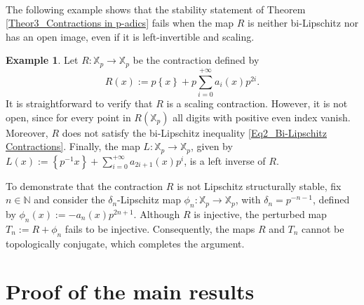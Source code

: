 \documentclass[a4paper, 12pt]{article}
\theoremstyle{definition}
\newtheorem{example}[theorem]{Example}
\begin{document}
	
	
	\paragraph{}
	
	The following example shows that the stability statement of Theorem \ref{Theor3_Contractions in p-adics} fails when the map $R$ is neither bi-Lipschitz nor has an open image, even if it is left-invertible and scaling. 
	
	
	\begin{example} 
		Let $R: \mathbb{X}_{p} \to \mathbb{X}_{p}$ be the contraction defined by  
		$$ R \left(  x  \right)  :=   p  \left\{  x  \right\}  + p \sum_{i=0}^{+ \infty }  a_{i} \left(  x  \right)  p^{2i}.  $$ 
		It is straightforward to verify that $R$ is a scaling contraction. 
		However, it is not open, since for every point in $R \left(  \mathbb{X}_{p}  \right) $ all digits with positive even index vanish. Moreover, $R$ does not satisfy the bi-Lipschitz inequality \eqref{Eq2_Bi-Lipschitz Contractions}. 
		Finally, the map $L : \mathbb{X}_{p} \to \mathbb{X}_{p}$, given by $L \left(  x  \right)  :=  \left\{  p^{-1} x  \right\}  + \sum_{i=0}^{+ \infty } a_{2i+1} \left(  x  \right)  p^{i}$, is a left inverse of $R$. 
		
		To demonstrate that the contraction $R$ is not Lipschitz structurally stable, fix $n \in \mathbb{N} $ and consider the $\delta_{n}$-Lipschitz map $\phi_{n}: \mathbb{X}_{p} \to \mathbb{X}_{p}$, with $\delta_{n} = p^{-n-1}$, defined by $\phi_{n} \left(  x  \right)  := - a_{n} \left(  x  \right)  p^{2n+1}$. 
		Although $R$ is injective, the perturbed map $T_{n}:= R + \phi_{n}$ fails to be injective. Consequently, the maps $R$ and $T_{n}$ cannot be topologically conjugate, which completes the argument.  
		
	\end{example}
	
	
	
	
	
	
	
	
	
	
	
	
	
	
	
	
	
	
	
	\section{Proof of the main results}\label{Sec_Proof of the main results}
	
\end{document}
